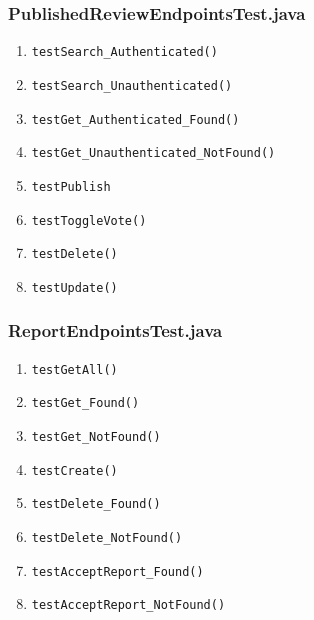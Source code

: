 \subsubsection{PublishedReviewEndpointsTest.java}
\begin{enumerate}
	\renewcommand{\theenumi}{\arabic{enumi}}
	\renewcommand{\labelenumi}{\theenumi}
	\item \texttt{testSearch\_Authenticated()} \label{test:testSearch_Auth:PubReview}
	\item \texttt{testSearch\_Unauthenticated()} \label{test:testSearch_Unauth:PubReview}
	\item \texttt{testGet\_Authenticated\_Found()} \label{test:testGet_Authenticated_Found:PubReview}
	\item \texttt{testGet\_Unauthenticated\_NotFound()} \label{test:testGet_Unauthenticated_NotFound:PubReview}
	\item \texttt{testPublish} \label{test:testPublish:PubReview}
	\item \texttt{testToggleVote()} \label{test:testToggleVote:PubReview}
	\item \texttt{testDelete()} \label{test:testDelete:PubReview}
	\item \texttt{testUpdate()} \label{test:testUpdate:PubReview}
\end{enumerate}

\subsubsection{ReportEndpointsTest.java}
\begin{enumerate}
	\renewcommand{\theenumi}{\arabic{enumi}}
	\renewcommand{\labelenumi}{\theenumi}
	\item \texttt{testGetAll()} \label{test:testGetAll:Report}
	\item \texttt{testGet\_Found()} \label{test:testGetFound:Report}
	\item \texttt{testGet\_NotFound()} \label{test:testGetNotFound:Report}
	\item \texttt{testCreate()} \label{test:testCreate:Report}
	\item \texttt{testDelete\_Found()} \label{test:testDeleteFound:Report}
	\item \texttt{testDelete\_NotFound()} \label{test:testDeleteNotFound:Report}
	\item \texttt{testAcceptReport\_Found()} \label{test:testAcceptReportFound:Report}
	\item \texttt{testAcceptReport\_NotFound()} \label{test:testAcceptReportNotFound:Report}
\end{enumerate}

